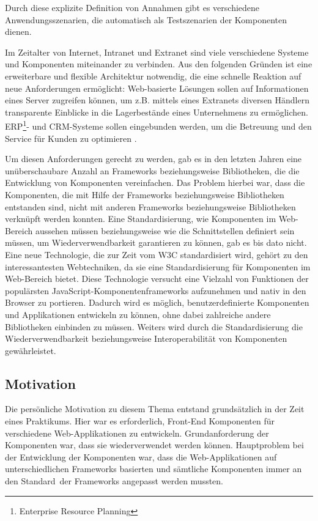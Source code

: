 Durch diese explizite Definition von Annahmen gibt es verschiedene Anwendungsszenarien, die automatisch als Testszenarien der Komponenten dienen.

Im Zeitalter von Internet, Intranet und Extranet sind viele verschiedene Systeme und Komponenten miteinander zu verbinden. Aus den folgenden Gründen ist eine erweiterbare und flexible Architektur notwendig, die eine schnelle Reaktion auf neue Anforderungen ermöglicht: Web-basierte Lösungen sollen auf Informationen eines Server zugreifen können, um z.B. mittels eines Extranets diversen Händlern transparente Einblicke in die Lagerbestände eines Unternehmens zu ermöglichen. ERP\footnote{Enterprise Resource Planning}- und CRM-Systeme sollen eingebunden werden, um die Betreuung und den Service für Kunden zu optimieren \citereset \autocite[siehe][S. 39-42]{Andresen.2003}.

Um diesen Anforderungen gerecht zu werden, gab es in den letzten Jahren eine unüberschaubare Anzahl an Frameworks beziehungsweise Bibliotheken, die die Entwicklung von Komponenten vereinfachen. Das Problem hierbei war, dass die Komponenten, die mit Hilfe der Frameworks beziehungsweise Bibliotheken entstanden sind, nicht mit anderen Frameworks beziehungsweise Bibliotheken verknüpft werden konnten. Eine Standardisierung, wie Komponenten im Web-Bereich aussehen müssen beziehungsweise wie die Schnittstellen definiert sein müssen, um Wiederverwendbarkeit garantieren zu können, gab es bis dato nicht. Eine neue Technologie, die zur Zeit vom W3C standardisiert wird, gehört zu den interessantesten Webtechniken, da sie eine Standardisierung für Komponenten im Web-Bereich bietet. Diese Technologie versucht eine Vielzahl von Funktionen der populärsten JavaScript-Komponentenframeworks aufzunehmen und nativ in den Browser zu portieren. Dadurch wird es möglich, benutzerdefinierte Komponenten und Applikationen entwickeln zu können, ohne dabei zahlreiche andere Bibliotheken einbinden zu müssen. Weiters wird durch die Standardisierung die Wiederverwendbarkeit beziehungsweise Interoperabilität von Komponenten gewährleistet.


\subsection{Motivation}
\label{sec:1_Motivation}

Die persönliche Motivation zu diesem Thema entstand grundsätzlich in der Zeit eines Praktikums. Hier war es erforderlich, Front-End Komponenten für verschiedene Web-Applikationen zu entwickeln. Grundanforderung der Komponenten war, dass sie wiederverwendet werden können. Hauptproblem bei der Entwicklung der Komponenten war, dass die Web-Applikationen auf unterschiedlichen Frameworks basierten und sämtliche Komponenten immer an den \glqq Standard\grqq\ der Frameworks angepasst werden mussten.

